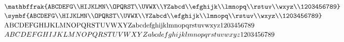 \documentclass{article}
\begin{document}
    $\mathbffrak{ABCDEFG\\HIJKLMN\\OPQRST\\UVWX\\YZabcd\\efghijk\\lmnopq\\rstuv\\wxyz\\1203456789}$\\
    $\symbf{ABCDEFG\\HIJKLMN\\OPQRST\\UVWX\\YZabcd\\efghijk\\lmnopq\\rstuv\\wxyz\\1203456789}$\\
    $\mathrm{ABCDEFG\\HIJKLMN\\OPQRST\\UVWX\\YZabcd\\efghijk\\lmnopq\\rstuv\\wxyz\\1203456789}$\\
    $ABCDEFG\\HIJKLMN\\OPQRST\\UVWX\\YZabcd\\efghijk\\lmnopq\\rstuv\\wxyz\\1203456789$\\
\end{document}
